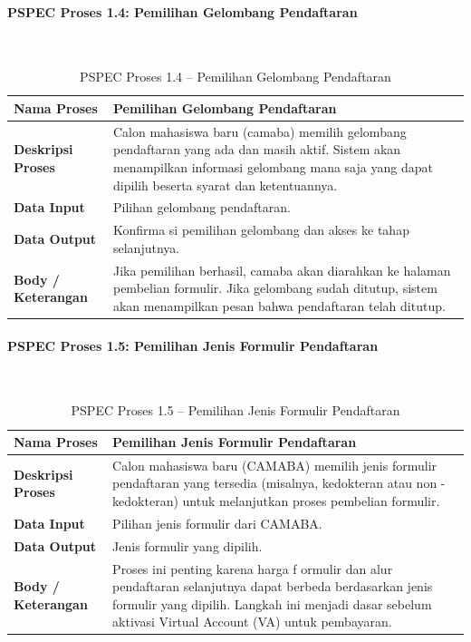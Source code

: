 \paragraph{PSPEC Proses 1.4: Pemilihan Gelombang Pendaftaran}~\\
\begin{longtable}{|p{}|p{}|}
	\caption{PSPEC Proses 1.4 -- Pemilihan Gelombang Pendaftaran}
	\label{table:3.pspec14}\\
	\hline
	\textbf{Nama Proses} & Pemilihan Gelombang Pendaftaran \\
	\hline
	\textbf{Deskripsi Proses} & Calon mahasiswa baru (camaba) memilih gelombang pendaftaran yang ada dan masih aktif. Sistem akan menampilkan informasi gelombang mana saja yang dapat dipilih beserta syarat dan ketentuannya. \\
	\hline
	\textbf{Data Input} & Pilihan gelombang pendaftaran. \\
	\hline
	\textbf{Data Output} & Konfirma si pemilihan gelombang dan akses ke tahap selanjutnya. \\
	\hline
	\textbf{Body / Keterangan} & Jika pemilihan berhasil, camaba akan diarahkan ke halaman pembelian formulir. Jika gelombang sudah ditutup, sistem akan menampilkan pesan bahwa pendaftaran telah ditutup. \\
	\hline
\end{longtable}

\paragraph{PSPEC Proses 1.5: Pemilihan Jenis Formulir Pendaftaran}~\\
\begin{longtable}{|p{}|p{}|}
	\caption{PSPEC Proses 1.5 -- Pemilihan Jenis Formulir Pendaftaran}
	\label{table:3.pspec15}\\
	\hline
	\textbf{Nama Proses} & Pemilihan Jenis Formulir Pendaftaran \\
	\hline
	\textbf{Deskripsi Proses} & Calon mahasiswa baru (CAMABA) memilih jenis formulir pendaftaran yang tersedia (misalnya, kedokteran atau non - kedokteran) untuk melanjutkan proses pembelian formulir. \\
	\hline
	\textbf{Data Input} & Pilihan jenis formulir dari CAMABA. \\
	\hline
	\textbf{Data Output} & Jenis formulir yang dipilih. \\
	\hline
	\textbf{Body / Keterangan} & Proses ini penting karena harga f ormulir dan alur pendaftaran selanjutnya dapat berbeda berdasarkan jenis formulir yang dipilih. Langkah ini menjadi dasar sebelum aktivasi Virtual Account (VA) untuk pembayaran. \\
	\hline
\end{longtable}

